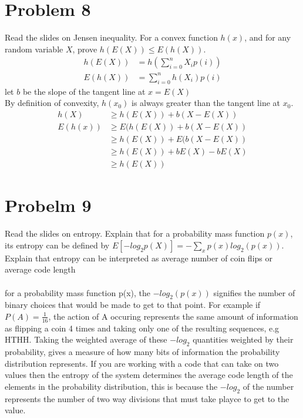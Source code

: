 \documentclass{article}
\begin{document}
\section{Problem 8}
Read the slides on Jensen inequality. For a convex function $h(x)$, and for
any random variable $X$, prove $h(E(X)) \le E(h(X))$.
\begin{align*}
    h(E(X)) &= h(\sum_{i=0}^{n}X_ip(i))\\
    E(h(X)) &= \sum_{i=0}^{n}h(X_i)p(i)
\end{align*}
let $b$ be the slope of the tangent line at $x = E(X)$\\
By definition of convexity, $h(x_0)$ is always greater than the tangent line at $x_0$.
\begin{align*}
    h(X) &\ge h(E(X)) + b(X-E(X))\\
    E(h(x)) &\ge E(h(E(X)) + b(X-E(X))\\
           &\ge h(E(X)) + E(b(X-E(X))\\
           &\ge h(E(X)) + bE(X) - bE(X) \\
           &\ge h(E(X))
\end{align*}
\section{Probelm 9}
Read the slides on entropy. Explain that for a probability mass function
$p(x)$, its entropy can be defined by $E[- log_2 p(X)] = -\sum_{x}^{}p(x)log_2(p(x))$.
 Explain that entropy can
be interpreted as average number of coin flips or average code length\\ \\
for a probability mass function p(x), the $-log_2(p(x))$ signifies the number of binary choices
that would be made to get to that point. For example if $P(A) = \frac{1}{16}$, the action of A occuring
represents the same amount of information as flipping a coin 4 times and taking only one of the resulting sequences, e.g HTHH.
Taking the weighted average of these $-log_2$ quantities weighted by their probability, gives a measure of how many bits of information
the probability distribution represents. If you are working with a code that can take on two values then the entropy of the system determines the average code length
of the elements in the probability distribution, this is because the $-log_2$ of the number represents the number of two way divisions that must take playce to get to the value.
\end{document}
